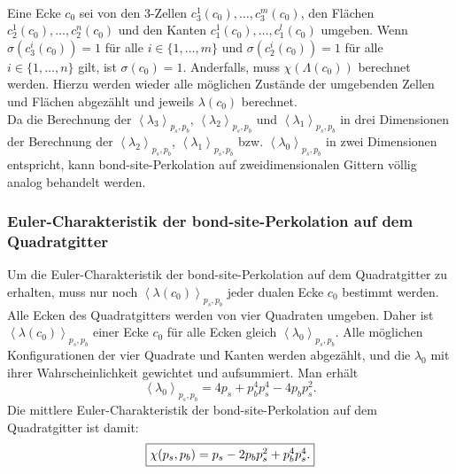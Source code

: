 \\Eine Ecke $c_0$ sei von den $3$-Zellen $c_3^1(c_0),\ldots,c_3^m(c_0)$, den Fl\"achen $c_2^1(c_0),\ldots,c_2^n(c_0)$ und den Kanten $c_1^1(c_0),\ldots,c_1^l(c_0)$ umgeben. Wenn $\sigma(c_3^i(c_0))=1$ f\"ur alle $i\in \{1,\ldots,m\}$ und $\sigma(c_2^i(c_0))=1$ f\"ur alle $i\in \{1,\ldots,n\}$ gilt, ist $\sigma(c_0)=1$. Anderfalls, muss $\chi(\Lambda(c_0))$ berechnet werden. Hierzu werden wieder alle m\"oglichen Zust\"ande der umgebenden Zellen und Fl\"achen abgez\"ahlt und jeweils $\lambda(c_0)$ berechnet.
\\Da die Berechnung der $\left<\lambda_3\right>_{p_s,p_b}$, $\left<\lambda_2\right>_{p_s,p_b}$ und $\left<\lambda_1\right>_{p_s,p_b}$ in drei Dimensionen der Berechnung der $\left<\lambda_2\right>_{p_s,p_b}$, $\left<\lambda_1\right>_{p_s,p_b}$ bzw. $\left<\lambda_0\right>_{p_s,p_b}$ in zwei Dimensionen entspricht, kann bond-site-Perkolation auf zweidimensionalen Gittern v\"ollig analog behandelt werden. 


\subsubsection{Euler-Charakteristik der bond-site-Perkolation auf dem Quadratgitter}
\label{sec:bondsitesq}
Um die Euler-Charakteristik der bond-site-Perkolation auf dem Quadratgitter zu erhalten, muss nur noch $\left<\lambda(c_0)\right>_{p_s,p_b}$ jeder dualen Ecke $c_0$ bestimmt werden. Alle Ecken des Quadratgitters werden von vier Quadraten umgeben. Daher ist $\left<\lambda(c_0)\right>_{p_s,p_b}$ einer Ecke $c_0$ f\"ur alle Ecken gleich $\left<\lambda_0\right>_{p_s,p_b}$. 
Alle m\"oglichen Konfigurationen der vier Quadrate und Kanten werden abgez\"ahlt, und die $\lambda_0$ mit ihrer Wahrscheinlichkeit gewichtet und aufsummiert. Man erh\"alt 
\begin{equation}
    \left<\lambda_0\right>_{p_s,p_b} = 4p_s+p_b^4p_s^4-4p_bp_s^2.
\end{equation}
Die mittlere Euler-Charakteristik der bond-site-Perkolation auf dem Quadratgitter ist damit:
\begin{equation}
  \label{eq:bondsitesq}
  \fbox{$ \chi(p_s,p_b)=p_s-2p_bp_s^2+p_b^4p_s^4.$}
\end{equation}
